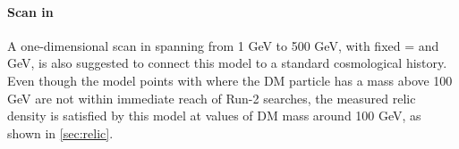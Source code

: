 \paragraph{Scan in \mDM}

A one-dimensional scan in \mDM spanning from 1 GeV to 500 GeV, with fixed \mA= and  GeV, is also suggested to connect this model to a standard cosmological history. Even though the model points with where the DM particle has a mass above 100 GeV are not within immediate reach of Run-2 searches, the measured relic density is satisfied by this model at values of DM mass around 100 GeV, as shown in \autoref{sec:relic}.

%
%
%
%
%
%
%
%
%
%
%
%
%
%
%
%
%
%
%
%
%


